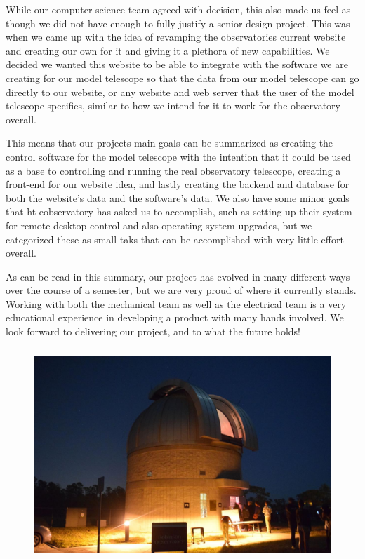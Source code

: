\documentclass[12pt]{report}
\begin{document}
While our computer science team agreed with decision, this also made us feel as though we did not have enough to fully justify a senior design project. This was when we came up with the idea of revamping the observatories current website and creating our own for it and giving it a plethora of new capabilities. We decided we wanted this website to be able to integrate with the software we are creating for our model telescope so that the data from our model telescope can go directly to our website, or any website and web server that the user of the model telescope specifies, similar to how we intend for it to work for the observatory overall.

This means that our projects main goals can be summarized as creating the control software for the model telescope with the intention that it could be used as a base to controlling and running the real observatory telescope, creating a front-end for our website idea, and lastly creating the backend and database for both the website’s data and the software’s data. We also have some minor goals that ht eobservatory has asked us to accomplish, such as setting up their system for remote desktop control and also operating system upgrades, but we categorized these as small taks that can be accomplished with very little effort overall.

As can be read in this summary, our project has evolved in many different ways over the course of a semester, but we are very proud of where it currently stands. Working with both the mechanical team as well as the electrical team is a very educational experience in developing a product with many hands involved. We look forward to delivering our project, and to what the future holds!

\begin{figure}[h]
	\centering
	\includegraphics[width=0.8\linewidth, height=8.0cm]{tele}
\end{figure}

\printbibliography[title={References}]
\end{document}

